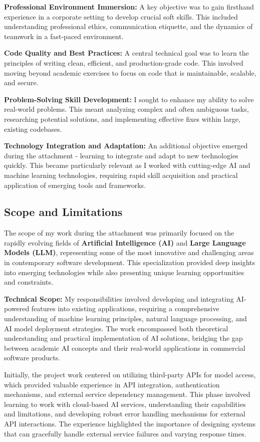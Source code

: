 \documentclass[12pt,a4paper]{article}
\begin{document}
\textbf{Professional Environment Immersion:} A key objective was to gain firsthand experience in a corporate setting to develop crucial soft skills. This included understanding professional ethics, communication etiquette, and the dynamics of teamwork in a fast-paced environment.

\textbf{Code Quality and Best Practices:} A central technical goal was to learn the principles of writing clean, efficient, and production-grade code. This involved moving beyond academic exercises to focus on code that is maintainable, scalable, and secure.

\textbf{Problem-Solving Skill Development:} I sought to enhance my ability to solve real-world problems. This meant analyzing complex and often ambiguous tasks, researching potential solutions, and implementing effective fixes within large, existing codebases.

\textbf{Technology Integration and Adaptation:} An additional objective emerged during the attachment - learning to integrate and adapt to new technologies quickly. This became particularly relevant as I worked with cutting-edge AI and machine learning technologies, requiring rapid skill acquisition and practical application of emerging tools and frameworks.

\subsection{Scope and Limitations}
The scope of my work during the attachment was primarily focused on the rapidly evolving fields of \textbf{Artificial Intelligence (AI)} and \textbf{Large Language Models (LLM)}, representing some of the most innovative and challenging areas in contemporary software development. This specialization provided deep insights into emerging technologies while also presenting unique learning opportunities and constraints.

\textbf{Technical Scope:} My responsibilities involved developing and integrating AI-powered features into existing applications, requiring a comprehensive understanding of machine learning principles, natural language processing, and AI model deployment strategies. The work encompassed both theoretical understanding and practical implementation of AI solutions, bridging the gap between academic AI concepts and their real-world applications in commercial software products.

Initially, the project work centered on utilizing third-party APIs for model access, which provided valuable experience in API integration, authentication mechanisms, and external service dependency management. This phase involved learning to work with cloud-based AI services, understanding their capabilities and limitations, and developing robust error handling mechanisms for external API interactions. The experience highlighted the importance of designing systems that can gracefully handle external service failures and varying response times.
\end{document}
